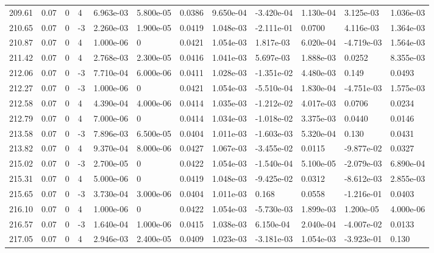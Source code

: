 \documentclass[preview]{standalone}
\begin{document}
{{{{{{{{{{{\begin{tabular}{L{1.2cm}C{1.2cm} C{0.3cm}C{0.5cm} C{1.4cm}C{1.4cm} C{1.4cm}C{1.4cm} C{1.6cm}C{1.6cm} C{1.6cm}C{1.6cm}}
  209.61  &  0.07  & 0     &  4 &  6.963e-03  & 5.800e-05  &  0.0386&   9.650e-04& -3.420e-04 & 1.130e-04   &  3.125e-03 & 1.036e-03  \\ 
  210.65  &  0.07  & 0     & -3 &  2.260e-03  & 1.900e-05  &  0.0419&   1.048e-03& -2.111e-01 & 0.0700   &  4.116e-03 & 1.364e-03  \\ 
  210.87  &  0.07  & 0     &  4 &  1.000e-06  & 0  &  0.0421&   1.054e-03& 1.817e-03 & 6.020e-04   &  -4.719e-03 & 1.564e-03  \\ 
  211.42  &  0.07  & 0     &  4 &  2.768e-03  & 2.300e-05  &  0.0416&   1.041e-03& 5.697e-03 & 1.888e-03   &  0.0252 & 8.355e-03  \\ 
  212.06  &  0.07  & 0     & -3 &  7.710e-04  & 6.000e-06  &  0.0411&   1.028e-03& -1.351e-02 & 4.480e-03   &  0.149 & 0.0493  \\ 
  212.27  &  0.07  & 0     & -3 &  1.000e-06  & 0  &  0.0421&   1.054e-03& -5.510e-04 & 1.830e-04   &  -4.751e-03 & 1.575e-03  \\ 
  212.58  &  0.07  & 0     &  4 &  4.390e-04  & 4.000e-06  &  0.0414&   1.035e-03& -1.212e-02 & 4.017e-03   &  0.0706 & 0.0234  \\ 
  212.79  &  0.07  & 0     &  4 &  7.000e-06  & 0  &  0.0414&   1.034e-03& -1.018e-02 & 3.375e-03   &  0.0440 & 0.0146  \\ 
  213.58  &  0.07  & 0     & -3 &  7.896e-03  & 6.500e-05  &  0.0404&   1.011e-03& -1.603e-03 & 5.320e-04   &  0.130 & 0.0431  \\ 
  213.82  &  0.07  & 0     &  4 &  9.370e-04  & 8.000e-06  &  0.0427&   1.067e-03& -3.455e-02 & 0.0115   &  -9.877e-02 & 0.0327  \\ 
  215.02  &  0.07  & 0     & -3 &  2.700e-05  & 0  &  0.0422&   1.054e-03& -1.540e-04 & 5.100e-05   &  -2.079e-03 & 6.890e-04  \\ 
  215.31  &  0.07  & 0     &  4 &  5.000e-06  & 0  &  0.0419&   1.048e-03& -9.425e-02 & 0.0312   &  -8.612e-03 & 2.855e-03  \\ 
  215.65  &  0.07  & 0     & -3 &  3.730e-04  & 3.000e-06  &  0.0404&   1.011e-03& 0.168 & 0.0558   &  -1.216e-01 & 0.0403  \\ 
  216.10  &  0.07  & 0     &  4 &  1.000e-06  & 0  &  0.0422&   1.054e-03& -5.730e-03 & 1.899e-03   &  1.200e-05 & 4.000e-06  \\ 
  216.57  &  0.07  & 0     & -3 &  1.640e-04  & 1.000e-06  &  0.0415&   1.038e-03& 6.150e-04 & 2.040e-04   &  -4.007e-02 & 0.0133  \\ 
  217.05  &  0.07  & 0     &  4 &  2.946e-03  & 2.400e-05  &  0.0409&   1.023e-03& -3.181e-03 & 1.054e-03   &  -3.923e-01 & 0.130  \\ 

\end{tabular}}}}}}}}}}}}
\end{document}

